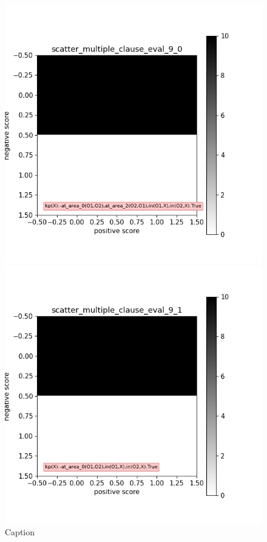 \begin{figure}[H]
    \centering
    \begin{minipage}{.3\textwidth}
        \includegraphics[width=\textwidth]{img/mce/mce-0}
        \caption{Caption}\label{label-a}
    \end{minipage}
    \begin{minipage}{.3\textwidth}
        \includegraphics[width=\textwidth]{img/mce/mce-1}

\end{minipage}
\end{figure}
